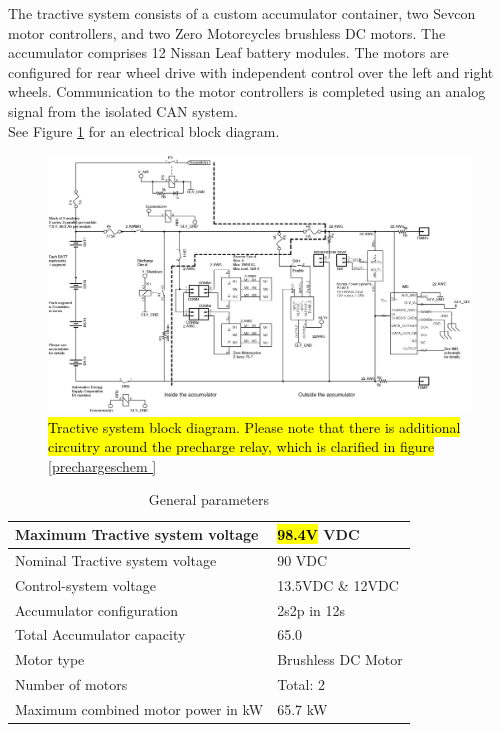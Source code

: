 \documentclass{article}
\DeclareRobustCommand{\hlr}[1]{{\sethlcolor{red}\hl{#1}}}
\begin{document}
    The tractive system consists of a custom accumulator container, two Sevcon motor controllers, and two Zero Motorcycles brushless DC motors. The accumulator comprises 12 Nissan Leaf battery modules. The motors are configured for rear wheel drive with independent control over the left and right wheels. Communication to the motor controllers is completed using an analog signal from the isolated CAN system.\\

    See Figure \ref{tractive} for an electrical block diagram.

        \begin{figure}
            \includegraphics[width=\textheight]{tractiveblock}
            \caption{\hlr{Tractive system block diagram. Please note that there is additional circuitry around the precharge relay, which is clarified in figure} \ref{prechargeschem
            }}
            \label{tractive}
        \end{figure}

        \begin{table}[H]
            \centering
            \begin{tabular}{|l|l|}
            \hline
                Maximum Tractive system voltage & \hlr{98.4V} VDC \\ \hline
                Nominal Tractive system voltage & 90 VDC \\ \hline
                Control-system voltage & 13.5VDC \& 12VDC\\ \hline
                Accumulator configuration & 2s2p in 12s \\ \hline
                Total Accumulator capacity & 65.0 \\ \hline
                Motor type & Brushless DC Motor \\ \hline
                Number of motors & Total: 2 \\ \hline
                Maximum combined motor power in kW & 65.7 kW \\ \hline
            \end{tabular}
            \caption{General parameters}
            \label{systemtable}
        \end{table}
\end{document}
